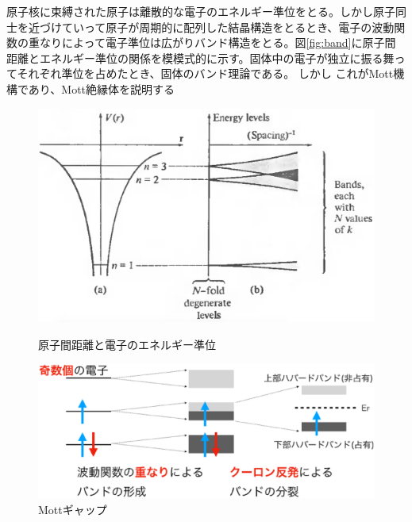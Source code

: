 原子核に束縛された原子は離散的な電子のエネルギー準位をとる。しかし原子同士を近づけていって原子が周期的に配列した結晶構造をとるとき、電子の波動関数の重なりによって電子準位は広がりバンド構造をとる。図\ref{fig:band}に原子間距離とエネルギー準位の関係を模模式的に示す。固体中の電子が独立に振る舞ってそれぞれ準位を占めたとき、固体のバンド理論である。
しかし
これがMott機構であり、Mott絶縁体を説明する
\begin{figure}[!h]
 \begin{minipage}{0.5\hsize}
    \begin{center}
   \includegraphics[width=\hsize]{Introduction/band.eps}
  \end{center}
  \caption{原子間距離と電子のエネルギー準位\cite{Ashcroft}}
  \label{fig:band}
 \end{minipage}
 \begin{minipage}{0.5\hsize}
    \begin{center}
   \includegraphics[width=\hsize]{Introduction/Mott_gap.eps}
  \end{center}
  \caption{Mottギャップ}
  \label{fig:Mott_gap}
 \end{minipage}
\end{figure}

